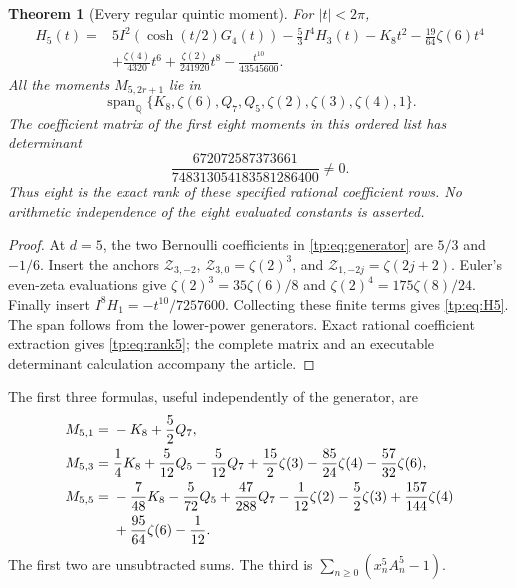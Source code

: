 \documentclass[11pt,a4paper]{article}
\numberwithin{equation}{section}
\newtheorem{theorem}{Theorem}[section]
\theoremstyle{definition}
\theoremstyle{remark}
\begin{document}
\begin{theorem}[Every regular quintic moment]
\label{tp:thm:five}
For $|t|<2\pi$,
\begin{equation}\label{tp:eq:H5}
 \boxed{\begin{aligned}
 H_5(t)={}&5I^2(\cosh(t/2)G_4(t))
            -\frac53I^4H_3(t)-K_8t^2
            -\frac{19}{64}\zeta(6)t^4\\
          &+\frac{\zeta(4)}{4320}t^6
            +\frac{\zeta(2)}{241920}t^8
            -\frac{t^{10}}{43545600}.
 \end{aligned}}
\end{equation}
All the moments $M_{5,2r+1}$ lie in
\begin{equation}\label{tp:eq:space5}
 \operatorname{span}_{\mathbb Q}
 \{K_8,\zeta(6),Q_7,Q_5,\zeta(2),\zeta(3),\zeta(4),1\}.
\end{equation}
The coefficient matrix of the first eight moments in this ordered
list has determinant
\begin{equation}\label{tp:eq:rank5}
 \frac{672072587373661}{748313054183581286400}\ne0.
\end{equation}
Thus eight is the exact rank of these specified rational coefficient
rows.  No arithmetic independence of the eight evaluated constants
is asserted.
\end{theorem}

\begin{proof}
At $d=5$, the two Bernoulli coefficients in \eqref{tp:eq:generator}
are $5/3$ and $-1/6$.  Insert the anchors
$\mathcal Z_{3,-2}$, $\mathcal Z_{3,0}=\zeta(2)^3$, and
$\mathcal Z_{1,-2j}=\zeta(2j+2)$.  Euler's even-zeta evaluations
give $\zeta(2)^3=35\zeta(6)/8$ and
$\zeta(2)^4=175\zeta(8)/24$.  Finally insert
$I^8H_1=-t^{10}/7257600$.  Collecting these finite terms gives
\eqref{tp:eq:H5}.  The span follows from the lower-power generators.
Exact rational coefficient extraction gives \eqref{tp:eq:rank5};
the complete matrix and an executable determinant calculation accompany
the article.
\end{proof}

The first three formulas, useful independently of the generator, are
\begin{align}
 M_{5,1}={}&-K_8+\frac52Q_7,\label{tp:eq:M51}\\
 M_{5,3}={}&\frac14K_8+\frac5{12}Q_5-\frac5{12}Q_7
           +\frac{15}{2}\zeta(3)-\frac{85}{24}\zeta(4)
           -\frac{57}{32}\zeta(6),\label{tp:eq:M53}\\
 M_{5,5}={}&-\frac7{48}K_8-\frac5{72}Q_5+\frac{47}{288}Q_7
           -\frac1{12}\zeta(2)-\frac52\zeta(3)
           +\frac{157}{144}\zeta(4)\notag\\
          &+\frac{95}{64}\zeta(6)-\frac1{12}.
          \label{tp:eq:M55}
\end{align}
The first two are unsubtracted sums.  The third is
$\sum_{n\geq0}(x_n^5A_n^5-1)$.
\end{document}
